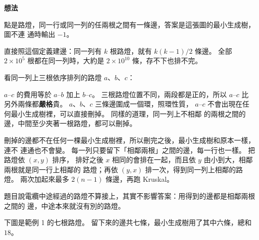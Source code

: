 \textbf{想法}

點是路燈，同一行或同一列的任兩根之間有一條邊，答案是這張圖的最小生成樹，圖不連
通時輸出 $-1$。

直接照這個定義建邊：同一列有 $k$ 根路燈，就有 $k(k - 1)/2$ 條邊。 全部 $2 \times
10^5$ 根都在同一列時，大約是 $2 \times 10^{10}$ 條，存不下也排不完。

看同一列上三根依序排列的路燈 $a$、$b$、$c$：

\begin{center}
\label{fig:mst-lamps-line}
\end{center}

$a$--$c$ 的費用等於 $a$--$b$ 加上 $b$--$c$。 三根路燈位置不同，兩段都是正的，所以
$a$--$c$ 比另外兩條都\textbf{嚴格}貴。 $a$、$b$、$c$ 三條邊圍成一個環，照環性質，
$a$--$c$ 不會出現在任何最小生成樹裡，可以直接刪掉。 同樣的道理，同一列上不相鄰
的兩根之間的邊，中間至少夾著一根路燈，都可以刪掉。

刪掉的邊都不在任何一棵最小生成樹裡，所以刪完之後，最小生成樹和原本一樣，連不
連通也不會變。 每一列只要留下「相鄰兩根」之間的邊，每一行也一樣。 把路燈依 $(x, y)$ 排序，
排好之後 $x$ 相同的會排在一起，而且依 $y$ 由小到大，相鄰兩根就是同一行上相鄰的
路燈；再依 $(y, x)$ 排一次，得到同一列上相鄰的路燈。 兩次加起來最多
$2(n - 1)$ 條邊，再跑 Kruskal。

題目說電纜中途經過的路燈不算接上，其實不影響答案：用得到的邊都是相鄰兩根之間的
邊，中途本來就沒有別的路燈。

下圖是範例 1 的七根路燈。 留下來的邊共七條，最小生成樹用了其中六條，總和
$18$。

